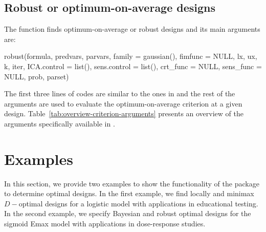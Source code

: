 \subsection{Robust or optimum-on-average designs}\label{sec:optimum-on-average}
The   function finds optimum-on-average or robust designs and its main arguments are:
  \begin{example}
robust(formula, predvars, parvars, family = gaussian(), fimfunc = NULL,
       lx, ux, k, iter, ICA.control = list(), sens.control = list(),
       crt_func = NULL, sens_func = NULL,
       prob, parset)
\end{example}
The first three lines of codes are similar to the ones in  and the rest of the arguments are used  to evaluate the optimum-on-average criterion at a given design.  Table~\ref{tab:overview-criterion-arguments} presents an overview of the  arguments specifically available in .

\section{ Examples}
\label{sec:examples}
In this section, we provide two examples to show the functionality of the   package to determine optimal designs. In the first example, we find locally and minimax $D-$optimal designs for a logistic model with applications in educational testing. In the second example, we specify Bayesian and robust optimal designs for the sigmoid Emax model with applications in dose-response studies.
